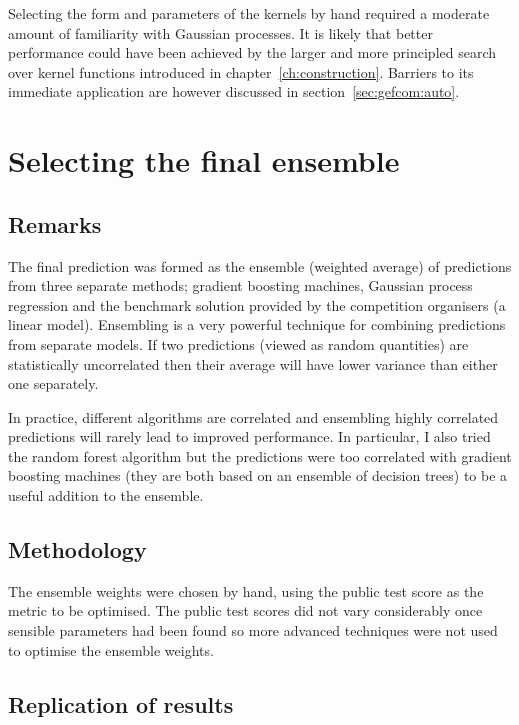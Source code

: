 Selecting the form and parameters of the kernels by hand required a moderate amount of familiarity with Gaussian processes.
It is likely that better performance could have been achieved by the larger and more principled search over kernel functions introduced in chapter~\ref{ch:construction}.
Barriers to its immediate application are however discussed in section~\ref{sec:gefcom:auto}.

\section{Selecting the final ensemble}

\label{sec:ensemble}

\subsection{Remarks}

The final prediction was formed as the ensemble (weighted average) of predictions from three separate methods; gradient boosting machines, Gaussian process regression and the benchmark solution provided by the competition organisers (a linear model).
Ensembling is a very powerful technique for combining predictions from separate models.
If two predictions (viewed as random quantities) are statistically uncorrelated then their average will have lower variance than either one separately.

In practice, different algorithms are correlated and ensembling highly correlated predictions will rarely lead to improved performance.
In particular, I also tried the random forest algorithm \citep{Breiman2001-at} but the predictions were too correlated with gradient boosting machines (they are both based on an ensemble of decision trees) to be a useful addition to the ensemble.

\subsection{Methodology}

The ensemble weights were chosen by hand, using the public test score as the metric to be optimised.
The public test scores did not vary considerably once sensible parameters had been found so more advanced techniques were not used to optimise the ensemble weights.

\subsection{Replication of results}

